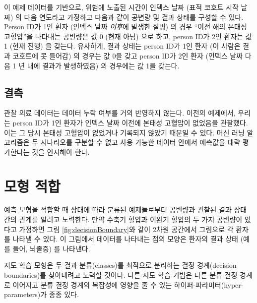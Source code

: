 \documentclass[11pt]{book}
\theoremstyle{definition}
\theoremstyle{definition}
\theoremstyle{definition}
\theoremstyle{remark}
\begin{document}
이 예제 데이터를 기반으로, 위험에 노출된 시간이 인덱스 날짜 (표적 코호트
시작 날짜) 의 다음 연도라고 가정하고 다음과 같이 공변량 및 결과 상태를
구성할 수 있다. Person ID가 1인 환자 (인덱스 날짜 \emph{이후}에 발생한
질병) 의 경우 ``이전 해의 본태성 고혈압''을 나타내는 공변량은 값 0 (현재
아님) 으로 하고, person ID가 2인 환자는 값 1 (현재 진행) 을 갖는다.
유사하게, 결과 상태는 person ID가 1인 환자 (이 사람은 결과 코호트에 못
들어감) 의 경우는 값 0을 갖고 person ID가 2인 환자 (인덱스 날짜 다음 1
년 내에 결과가 발생하였음) 의 경우에는 값 1을 갖는다.

\subsection{결측}

관찰 의료 데이터는 데이터 누락 여부를 거의 반영하지 않는다. 이전의
예제에서, 우리는 person ID가 1인 환자가 인덱스 날짜 이전에 본태성
고혈압이 없었음을 관찰했다. 이는 그 당시 본태성 고혈압이 없었거나
기록되지 않았기 때문일 수 있다. 머신 러닝 알고리즘은 두 시나리오를
구분할 수 없고 사용 가능한 데이터 안에서 예측값을 대략 평가한다는 것을
인지해야 한다. 

\section{모형 적합}\label{modelFitting}

예측 모형을 적합할 때 상태에 따라 분류된 예제들로부터 공변량과 관찰된
결과 상태 간의 관계를 알려고 노력한다. 만약 수축기 혈압과 이완기 혈압의
두 가지 공변량이 있다고 가정하면 그림 \ref{fig:decisionBoundary}와 같이
2차원 공간에서 그림으로 각 환자를 나타낼 수 있다. 이 그림에서 데이터를
나타내는 점의 모양은 환자의 결과 상태 (예를 들어, 뇌졸중) 를 나타낸다.

지도 학습 모형은 두 결과 분류(classes)를 최적으로 분리하는 결정
경계(decision boundaries)를 찾아내려고 노력할 것이다. 다른 지도 학습
기법은 다른 분류 결정 경계로 이어지고 분류 결정 경계의 복잡성에 영향을
줄 수 있는 하이퍼-파라미터(hyper-parameters)가 종종
있다.
\end{document}
